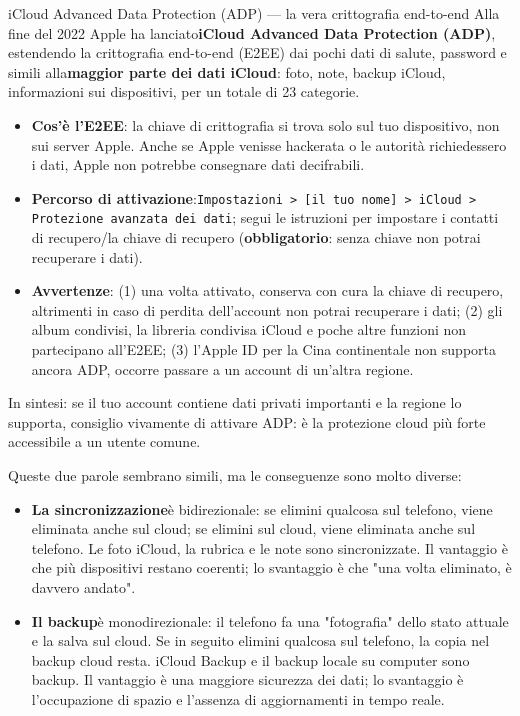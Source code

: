 \begin{tcbwarn}{iCloud Advanced Data Protection (ADP) — la vera crittografia end-to-end}
Alla fine del 2022 Apple ha lanciato\textbf{iCloud Advanced Data Protection (ADP)}, estendendo la crittografia end-to-end (E2EE) dai pochi dati di salute, password e simili alla\textbf{maggior parte dei dati iCloud}: foto, note, backup iCloud, informazioni sui dispositivi, per un totale di 23 categorie.

\begin{itemize}
  \item \textbf{Cos'è l'E2EE}: la chiave di crittografia si trova solo sul tuo dispositivo, non sui server Apple. Anche se Apple venisse hackerata o le autorità richiedessero i dati, Apple non potrebbe consegnare dati decifrabili.
  \item \textbf{Percorso di attivazione}:\texttt{Impostazioni > [il tuo nome] > iCloud > Protezione avanzata dei dati}; segui le istruzioni per impostare i contatti di recupero/la chiave di recupero (\textbf{obbligatorio}: senza chiave non potrai recuperare i dati).
  \item \textbf{Avvertenze}: (1) una volta attivato, conserva con cura la chiave di recupero, altrimenti in caso di perdita dell'account non potrai recuperare i dati; (2) gli album condivisi, la libreria condivisa iCloud e poche altre funzioni non partecipano all'E2EE; (3) l'Apple ID per la Cina continentale non supporta ancora ADP, occorre passare a un account di un'altra regione.
\end{itemize}

In sintesi: se il tuo account contiene dati privati importanti e la regione lo supporta, consiglio vivamente di attivare ADP: è la protezione cloud più forte accessibile a un utente comune.

\end{tcbwarn}


Queste due parole sembrano simili, ma le conseguenze sono molto diverse:

\begin{itemize}
  \item \textbf{La sincronizzazione}è bidirezionale: se elimini qualcosa sul telefono, viene eliminata anche sul cloud; se elimini sul cloud, viene eliminata anche sul telefono. Le foto iCloud, la rubrica e le note sono sincronizzate. Il vantaggio è che più dispositivi restano coerenti; lo svantaggio è che "una volta eliminato, è davvero andato".
  \item \textbf{Il backup}è monodirezionale: il telefono fa una "fotografia" dello stato attuale e la salva sul cloud. Se in seguito elimini qualcosa sul telefono, la copia nel backup cloud resta. iCloud Backup e il backup locale su computer sono backup. Il vantaggio è una maggiore sicurezza dei dati; lo svantaggio è l'occupazione di spazio e l'assenza di aggiornamenti in tempo reale.
\end{itemize}

